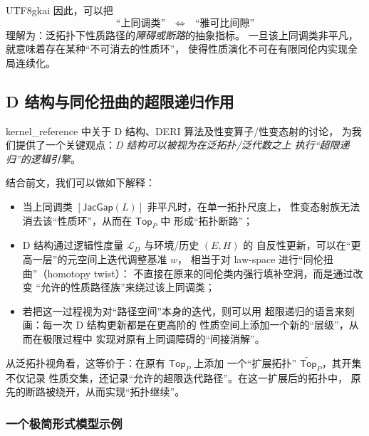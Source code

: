 \documentclass[12pt]{article}
\newcommand{\JacGap}{\mathsf{JacGap}}
\begin{document}
\begin{CJK*}{UTF8}{gkai}
因此，可以把
\[
  \text{“上同调类”} \quad\Longleftrightarrow\quad \text{“雅可比间隙”}
\]
理解为：泛拓扑下性质路径的\emph{障碍或断路}的抽象指标。
一旦该上同调类非平凡，就意味着存在某种“不可消去的性质环”，
使得性质演化不可在有限同伦内实现全局连续化。

\subsection{D 结构与同伦扭曲的超限递归作用}

kernel\_reference 中关于 D 结构、DERI 算法及性变算子/性变态射的讨论，
为我们提供了一个关键观点：\emph{D 结构可以被视为在泛拓扑/泛代数之上
执行“超限递归”的逻辑引擎}。

结合前文，我们可以做如下解释：
\begin{itemize}
  \item 当上同调类 $[\JacGap(L)]$ 非平凡时，在单一拓扑尺度上，
        性变态射族无法消去该“性质环”，从而在 $\mathsf{Top}_P$ 中
        形成“拓扑断路”；
  \item D 结构通过逻辑性度量 $\mathcal{L}_D$ 与环境/历史 $(E,H)$ 的
        自反性更新，可以在“更高一层”的元空间上迭代调整基准 $w$，
        相当于对 law-space 进行“同伦扭曲”（homotopy twist）：
        不直接在原来的同伦类内强行填补空洞，而是通过改变
        “允许的性质路径族”来绕过该上同调类；
  \item 若把这一过程视为对“路径空间”本身的迭代，则可以用
        超限递归的语言来刻画：每一次 D 结构更新都是在更高阶的
        性质空间上添加一个新的“层级”，从而在极限过程中
        实现对原有上同调障碍的“间接消解”。
\end{itemize}

从泛拓扑视角看，这等价于：在原有 $\mathsf{Top}_P$ 上添加
一个“扩展拓扑” $\widetilde{\mathsf{Top}}_P$，其开集不仅记录
性质交集，还记录“允许的超限迭代路径”。在这一扩展后的拓扑中，
原先的断路被绕开，从而实现“拓扑继续”。

\subsubsection*{一个极简形式模型示例}


\end{CJK*}
\end{document}
